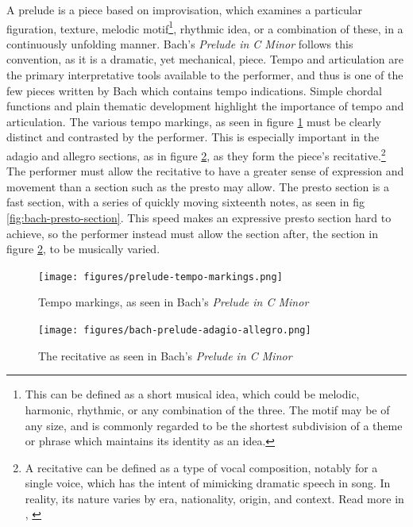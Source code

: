 A prelude is a piece based on improvisation, which examines a particular figuration, texture, melodic motif\autocite{Drabkin_2001}\footnote{This can be defined as a short musical idea, which could be melodic, harmonic, rhythmic, or any combination of the three. The motif may be of any size, and is commonly regarded to be the shortest subdivision of a theme or phrase which maintains its identity as an idea.}, rhythmic idea, or a combination of these, in a continuously unfolding manner. Bach's \textit{Prelude in C Minor} follows this convention, as it is a dramatic, yet mechanical, piece. Tempo and articulation are the primary interpretative tools available to the performer, and thus is one of the few pieces written by Bach which contains tempo indications. Simple chordal functions and plain thematic development highlight the importance of tempo and articulation. The various tempo markings, as seen in figure \ref{fig:prelude-tempo-markings}\autocite{Henle_2009} must be clearly distinct and contrasted by the performer. This is especially important in the adagio and allegro sections, as in figure \ref{fig:prelude-recitative}\autocite{Henle_2009},
as they form the piece's recitative.\footnote{A recitative can be defined as a type of vocal composition, notably for a single voice, which has the intent of mimicking dramatic speech in song. In reality, its nature varies by era, nationality, origin, and context. Read more in \citeauthor{Monson_Westrup_Budden_2001}, \citeyear{Monson_Westrup_Budden_2001}} The performer must allow the recitative to have a greater sense of expression and movement than a section such as the presto may allow. The presto section is a fast section, with a series of quickly moving sixteenth notes, as seen in fig \ref{fig:bach-presto-section}\autocite{Henle_2009}. This speed makes an expressive presto section hard to achieve, so the performer instead must allow the section after, the section in figure \ref{fig:prelude-recitative}\autocite{Henle_2009}, to be musically varied. 
\begin{figure}
    \centering
    \texttt{[image: figures/prelude-tempo-markings.png]}
    \caption{Tempo markings, as seen in Bach's \textit{Prelude in C Minor}}
    \label{fig:prelude-tempo-markings}
\end{figure}

\begin{figure}
    \centering
    \texttt{[image: figures/bach-prelude-adagio-allegro.png]}
    \caption{The recitative as seen in Bach's \textit{Prelude in C Minor}}
    \label{fig:prelude-recitative}
\end{figure}

